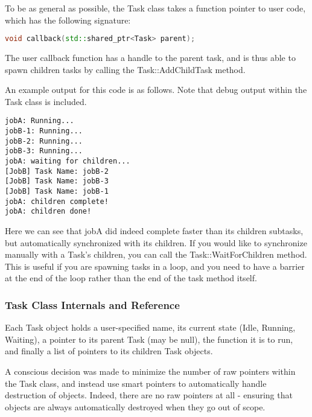 \documentclass[11pt]{article}
\begin{document}
                To be as general as possible, the Task class takes a function pointer to user code, which
                has the following signature:
                                
                \begin{lstlisting}[language=C++]
void callback(std::shared_ptr<Task> parent);
                \end{lstlisting}
                
                                
                The user callback function has a handle to the parent task, and is thus able to spawn
                children tasks by calling the Task::AddChildTask method.
                
                An example output for this code is as follows. Note that debug output within the Task class is
                included.
                
                \pagebreak
                
                \begin{verbatim}
jobA: Running...
jobB-1: Running...
jobB-2: Running...
jobB-3: Running...
jobA: waiting for children...
[JobB] Task Name: jobB-2
[JobB] Task Name: jobB-3
[JobB] Task Name: jobB-1
jobA: children complete!
jobA: children done!
                \end{verbatim}
                
                Here we can see that jobA did indeed complete faster than its children subtasks, but automatically
                synchronized with its children. If you would like to synchronize manually with a Task's children,
                you can call the Task::WaitForChildren method. This is useful if you are spawning tasks in a loop,
                and you need to have a barrier at the end of the loop rather than the end of the task method itself.
                
            \subsubsection{Task Class Internals and Reference}
                Each Task object holds a user-specified name, its current state (Idle, Running, Waiting), 
                a pointer to its parent Task (may be null), the function it is to run, and finally a list of pointers
                to its children Task objects. 
                
                A conscious decision was made to minimize the number of raw pointers within the Task class, and instead
                use smart pointers to automatically handle destruction of objects. Indeed, there are no raw pointers
                at all - ensuring that objects are always automatically destroyed when they go out of scope. 
                
\end{document}
